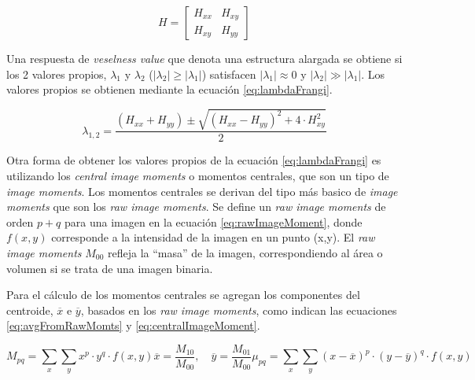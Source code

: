 \begin{equation}
    \label{eq:HessianMat}
    H = \begin{bmatrix}
        H_{xx} & H_{xy} \\
        H_{xy} & H_{yy} 
        \end{bmatrix}
\end{equation}

Una respuesta de {\it veselness value} que denota una estructura alargada se obtiene si los 2 valores propios, $\lambda_1$ y $\lambda_2$ ($|\lambda_2| \geq |\lambda_1|$) satisfacen $|\lambda_1| \approx 0 $ y $|\lambda_2| \gg |\lambda_1|$. Los valores propios se obtienen mediante la ecuaci\'on \ref{eq:lambdaFrangi}.

\begin{equation}
    \label{eq:lambdaFrangi}
    \lambda_{1,2} = \dfrac{(H_{xx} + H_{yy}) \pm \sqrt{(H_{xx} - H_{yy})^{2} + 4\cdot H_{xy}^{2}     } }{2}
\end{equation}

Otra forma de obtener los valores propios de la ecuaci\'on \ref{eq:lambdaFrangi} es utilizando los {\it central image moments} o momentos centrales, que son un tipo de {\it image moments}. Los momentos centrales se derivan del tipo m\'as basico de {\it image moments} que son los {\it raw image moments}. Se define un {\it raw image moments} de orden $p+q$ para una imagen en la ecuaci\'on \ref{eq:rawImageMoment}, donde $f(x,y)$ corresponde a la intensidad de la imagen en un punto (x,y). El {\it raw image moments} $M_{00}$ refleja la ``masa'' de la imagen, correspondiendo al \'area o volumen si se trata de una imagen binaria. 

Para el c\'alculo de los momentos centrales se agregan los componentes del centroide, $\overline{x}$ e $\overline{y}$, basados en los {\it raw image moments}, como indican las ecuaciones \ref{eq:avgFromRawMomts} y \ref{eq:centralImageMoment}.

\begin{subequations}
\begin{equation}
    \label{eq:rawImageMoment}
    M_{pq} = \sum\limits_{x} \sum\limits_{y} x^p \cdot y^q \cdot f(x,y)
\end{equation}
\begin{equation}
    \label{eq:avgFromRawMomts}
    \overline{x} = \frac{M_{10}}{M_{00}}, \quad
    \overline{y} = \frac{M_{01}}{M_{00}}
\end{equation}
\begin{equation}
    \label{eq:centralImageMoment}
    \mu_{pq} = \sum\limits_{x} \sum\limits_{y} (x - \overline{x})^{p} \cdot (y - \overline{y})^{q} \cdot f(x,y)
\end{equation}
\end{subequations}

